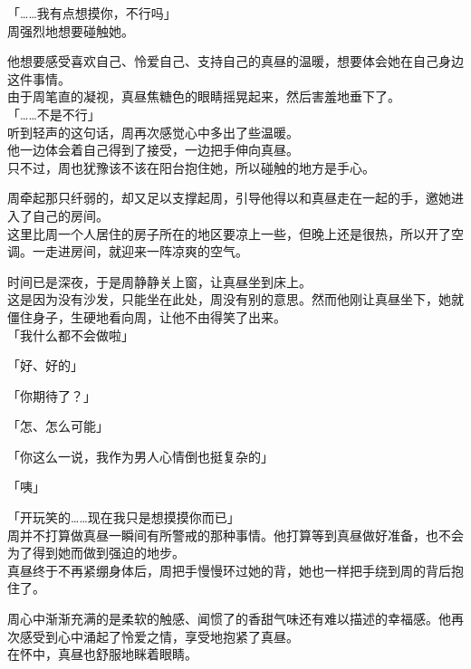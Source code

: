 「……我有点想摸你，不行吗」\\

周强烈地想要碰触她。

他想要感受喜欢自己、怜爱自己、支持自己的真昼的温暖，想要体会她在自己身边这件事情。\\

由于周笔直的凝视，真昼焦糖色的眼睛摇晃起来，然后害羞地垂下了。\\

「……不是不行」\\

听到轻声的这句话，周再次感觉心中多出了些温暖。\\

他一边体会着自己得到了接受，一边把手伸向真昼。\\

只不过，周也犹豫该不该在阳台抱住她，所以碰触的地方是手心。

周牵起那只纤弱的，却又足以支撑起周，引导他得以和真昼走在一起的手，邀她进入了自己的房间。\\

这里比周一个人居住的房子所在的地区要凉上一些，但晚上还是很热，所以开了空调。一走进房间，就迎来一阵凉爽的空气。

时间已是深夜，于是周静静关上窗，让真昼坐到床上。\\

这是因为没有沙发，只能坐在此处，周没有别的意思。然而他刚让真昼坐下，她就僵住身子，生硬地看向周，让他不由得笑了出来。\\

「我什么都不会做啦」

「好、好的」

「你期待了？」

「怎、怎么可能」

「你这么一说，我作为男人心情倒也挺复杂的」

「咦」

「开玩笑的……现在我只是想摸摸你而已」\\

周并不打算做真昼一瞬间有所警戒的那种事情。他打算等到真昼做好准备，也不会为了得到她而做到强迫的地步。\\

真昼终于不再紧绷身体后，周把手慢慢环过她的背，她也一样把手绕到周的背后抱住了。

周心中渐渐充满的是柔软的触感、闻惯了的香甜气味还有难以描述的幸福感。他再次感受到心中涌起了怜爱之情，享受地抱紧了真昼。\\

在怀中，真昼也舒服地眯着眼睛。

